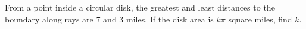 From a point inside a circular disk, the greatest and least distances to the boundary along rays are 7 and 3 miles. If the disk area is $k\pi$ square miles, find $k$.
